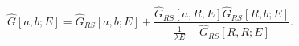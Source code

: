 \begin{equation}
\label{fixed-e4}
\hat{G}[a, b; E] = \hat{G}_{RS}[a, b; E] + 
\frac{\hat{G}_{RS}[a, R; E] \hat{G}_{RS}[R, b; E]}
     {\frac{1}{\lambda E} - \hat{G}_{RS}[R, R; E]}.
\end{equation}

